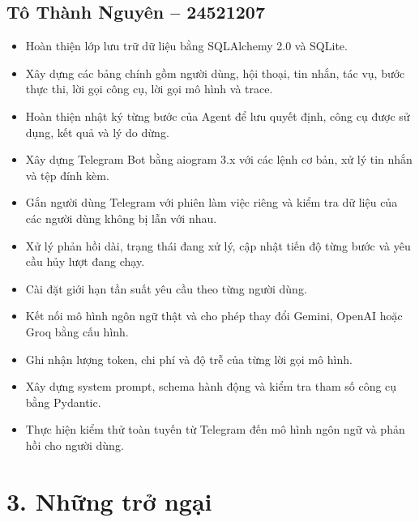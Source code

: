\documentclass[12pt,a4paper]{article}
\begin{document}
\subsection*{Tô Thành Nguyên -- 24521207}

\begin{itemize}
    \item Hoàn thiện lớp lưu trữ dữ liệu bằng SQLAlchemy 2.0 và SQLite.

    \item Xây dựng các bảng chính gồm người dùng, hội thoại, tin nhắn, tác vụ, bước thực thi, lời gọi công cụ, lời gọi mô hình và trace.

    \item Hoàn thiện nhật ký từng bước của Agent để lưu quyết định, công cụ được sử dụng, kết quả và lý do dừng.

    \item Xây dựng Telegram Bot bằng aiogram 3.x với các lệnh cơ bản, xử lý tin nhắn và tệp đính kèm.

    \item Gắn người dùng Telegram với phiên làm việc riêng và kiểm tra dữ liệu của các người dùng không bị lẫn với nhau.

    \item Xử lý phản hồi dài, trạng thái đang xử lý, cập nhật tiến độ từng bước và yêu cầu hủy lượt đang chạy.

    \item Cài đặt giới hạn tần suất yêu cầu theo từng người dùng.

    \item Kết nối mô hình ngôn ngữ thật và cho phép thay đổi Gemini, OpenAI hoặc Groq bằng cấu hình.

    \item Ghi nhận lượng token, chi phí và độ trễ của từng lời gọi mô hình.

    \item Xây dựng system prompt, schema hành động và kiểm tra tham số công cụ bằng Pydantic.

    \item Thực hiện kiểm thử toàn tuyến từ Telegram đến mô hình ngôn ngữ và phản hồi cho người dùng.
\end{itemize}

\section*{3. Những trở ngại}
\end{document}
